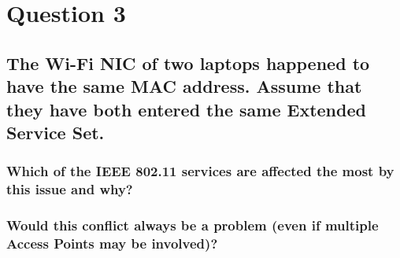 \documentclass{report}
\begin{document}
	\section{Question 3}
	\startsection
		\renewcommand{\thesubsection}{\thesection.\Alph{subsection}}
		\subsection{The Wi-Fi NIC of two laptops happened to have the same MAC address. Assume that they have both entered the same Extended Service Set.}
		\startsubsection
			\subsubsection{Which of the IEEE 802.11 services are affected the most by this issue and why?}
			\startsubsection
			\closesection
			\subsubsection{Would this conflict always be a problem (even if multiple Access Points may be involved)?}
			\startsubsection
			\closesection
		\closesection
	\closesection
\end{document}
